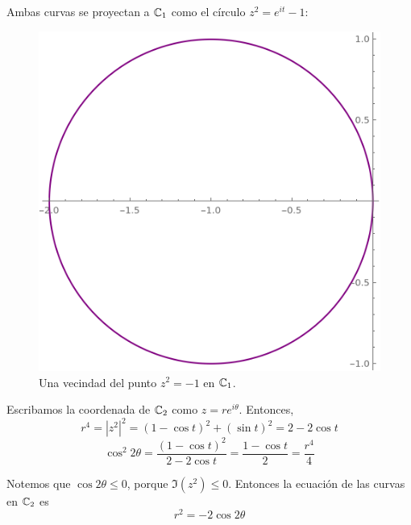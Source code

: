 \begin{solution}
Ambas curvas se proyectan a $\mathbb C_1$ como el círculo $z^2 = e^{it} - 1$:
\begin{figure}[h]
    \centering
    \includegraphics[scale=0.4]{c1.png}
    \caption{Una vecindad del punto $z^2 = -1$ en $\mathbb C_1$.}
\end{figure}

Escribamos la coordenada de $\mathbb C_2$ como $z = re^{i\theta}$. Entonces,
$$r^4 = |z^2|^2 = (1 - \cos t)^2 + (\sin t)^2 = 2 - 2 \cos t$$
$$\cos^2 2\theta
    = \frac {(1 - \cos t)^2} {2 - 2 \cos t}
    = \frac {1 - \cos t} 2
    = \frac {r^4} 4
$$

Notemos que $\cos 2\theta \le 0$, porque $\Im(z^2) \le 0$. Entonces la ecuación de las curvas en $\mathbb C_2$ es
$$r^2 = -2 \cos 2\theta$$


\end{solution}
